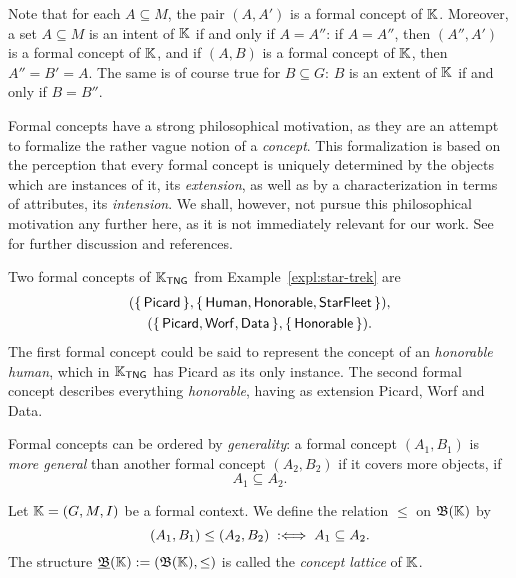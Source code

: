 Note that for each $A \subseteq M$, the pair $(A, A')$ is a formal concept of ${\mathbb{K}}$.
Moreover, a set $A \subseteq M$ is an intent of ${\mathbb{K}}$ if and only if $A = A''$: if $A =
A''$, then $(A'', A')$ is a formal concept of ${\mathbb{K}}$, and if $(A, B)$ is a formal
concept of ${\mathbb{K}}$, then $A'' = B' = A$.  The same is of course true for $B \subseteq G$:
$B$ is an extent of ${\mathbb{K}}$ if and only if $B = B''$.

Formal concepts have a strong philosophical motivation, as they are an attempt to
formalize the rather vague notion of a \emph{concept}.  This formalization is based on the
perception that every formal concept is uniquely determined by the objects which are
instances of it, its \emph{extension}, as well as by a characterization in terms of
attributes, its \emph{intension}.  We shall, however, not pursue this philosophical
motivation any further here, as it is not immediately relevant for our work.
See~\cite{fca-book} for further discussion and references.

\begin{Example}
  \label{expl:5}
  Two formal concepts of ${\mathbb{K}}_{\mathsf{TNG}}$ from Example~\ref{expl:star-trek} are
  \begin{gather*}
    ({\{\,\mathsf{Picard}\,\}}, {\{\,\mathsf{Human}, \mathsf{Honorable},
      \mathsf{StarFleet}\,\}}),\\
    ({\{\,\mathsf{Picard}, \mathsf{Worf}, \mathsf{Data}\,\}}, {\{\,\mathsf{Honorable}\,\}}).
  \end{gather*}
  The first formal concept could be said to represent the concept of an \emph{honorable
    human}, which in ${\mathbb{K}}_{\mathsf{TNG}}$ has \textsf{Picard} as its only instance.
  The second formal concept describes everything \emph{honorable}, having as extension
  \textsf{Picard}, \textsf{Worf} and \textsf{Data}.
\end{Example}

Formal concepts can be ordered by \emph{generality}: a formal concept $(A_1, B_1)$ is
\emph{more general} than another formal concept $(A_2, B_2)$ if it covers more objects,
\ie if
\begin{equation*}
  A_1 \subseteq A_2.
\end{equation*}

\begin{Definition}
  \label{def:concept-lattice}
  Let ${\mathbb{K}} = (G, M, I)$ be a formal context.  We define the relation $\le$ on $\operatorname{{\mathfrak{B}}}({\mathbb{K}})$ by
  \begin{equation*}
    (A_1, B_1) \leq (A_2, B_2) \;:\Longleftrightarrow\; A_1 \subseteq A_2.
  \end{equation*}
  The structure ${\underline{\operatorname{{\mathfrak{B}}}}}({\mathbb{K}}) := (\operatorname{{\mathfrak{B}}}({\mathbb{K}}), \leq)$ is called the \emph{concept
    lattice} of ${\mathbb{K}}$.
\end{Definition}

